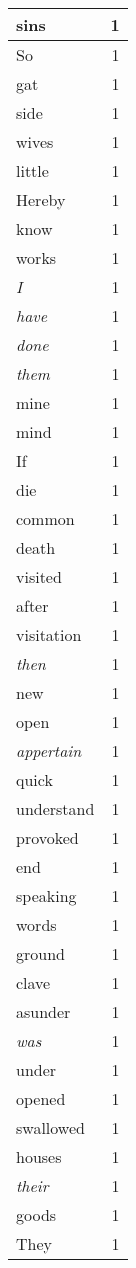 \begin{center}
\begin{longtable}{l|r}
sins & 1 \\ \hline
So & 1 \\ \hline
gat & 1 \\ \hline
side & 1 \\ \hline
wives & 1 \\ \hline
little & 1 \\ \hline
Hereby & 1 \\ \hline
know & 1 \\ \hline
works & 1 \\ \hline
\emph{I} & 1 \\ \hline
\emph{have} & 1 \\ \hline
\emph{done} & 1 \\ \hline
\emph{them} & 1 \\ \hline
mine & 1 \\ \hline
mind & 1 \\ \hline
If & 1 \\ \hline
die & 1 \\ \hline
common & 1 \\ \hline
death & 1 \\ \hline
visited & 1 \\ \hline
after & 1 \\ \hline
visitation & 1 \\ \hline
\emph{then} & 1 \\ \hline
new & 1 \\ \hline
open & 1 \\ \hline
\emph{appertain} & 1 \\ \hline
quick & 1 \\ \hline
understand & 1 \\ \hline
provoked & 1 \\ \hline
end & 1 \\ \hline
speaking & 1 \\ \hline
words & 1 \\ \hline
ground & 1 \\ \hline
clave & 1 \\ \hline
asunder & 1 \\ \hline
\emph{was} & 1 \\ \hline
under & 1 \\ \hline
opened & 1 \\ \hline
swallowed & 1 \\ \hline
houses & 1 \\ \hline
\emph{their} & 1 \\ \hline
goods & 1 \\ \hline
They & 1 \\ \hline

\end{longtable}
\end{center}
